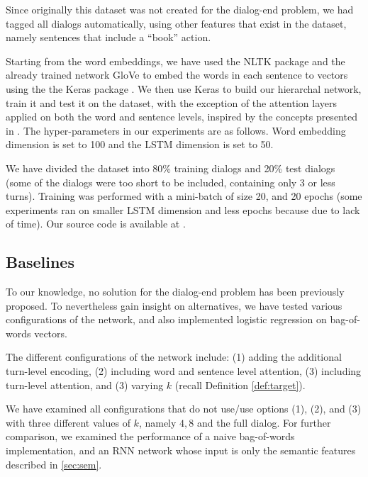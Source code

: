 Since originally this dataset was not created for the dialog-end problem, 
we had tagged all dialogs automatically, using other features that exist 
in the dataset, namely sentences that include a ``book'' action. 

Starting from the word embeddings, we have used the 
NLTK package \cite{DBLP:conf/acl/Bird06} and the already trained network GloVe \cite{glove} 
to embed the words in each sentence to vectors using the the Keras package \cite{chollet2015}. 
We then use Keras to build our hierarchal network, train it and test it on the 
dataset, with the exception of the attention layers applied on both the word and sentence 
levels, inspired by the concepts presented in \cite{attention}. 
The hyper-parameters in our experiments are as follows. 
Word embedding dimension is set to 100 and the 
LSTM dimension is set to 50. 

We have divided the dataset into 80\% training dialogs and 20\% test dialogs 
(some of the dialogs were too short to be included, containing only 3 or less turns).
Training was performed with a mini-batch of size 20, 
and 20 epochs (some experiments ran on smaller LSTM dimension and less epochs because due to 
lack of time). Our source code is available at \cite{code}.

\subsection{Baselines}%
To our knowledge, no solution for the 
dialog-end problem has been previously proposed. To nevertheless
gain insight on alternatives, we have tested various configurations 
of the network, and also implemented logistic regression on bag-of-words vectors.

The different configurations of the network include: 
(1) adding the additional turn-level encoding, 
(2) including word and sentence level attention, 
(3) including turn-level attention, and 
(3) varying $k$ (recall Definition \ref{def:target}).

We have examined all configurations that do not use/use options 
(1), (2), and (3) with three different values of $k$, namely $4,8$ and 
the full dialog. 
For further comparison, we examined the performance of a naive bag-of-words 
implementation, and an RNN network whose input is only the semantic features described in \ref{sec:sem}. 


